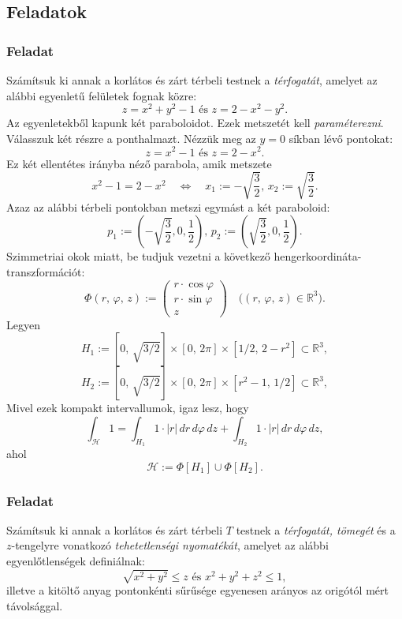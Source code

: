 \documentclass{article}
\newcommand{\R}{\mathbb{R}}
\begin{document}
	\subsection{Feladatok}
	\subsubsection{Feladat}
	Számítsuk ki annak a korlátos és zárt térbeli testnek a \textit{térfogatát}, amelyet az alábbi egyenletű felületek fognak közre:
	\[
		z = x^2 + y^2 -1 \text{ és } z = 2 - x^2 - y^2.
	\]
	Az egyenletekből kapunk két paraboloidot. Ezek metszetét kell \textit{paraméterezni}. Válasszuk két részre a ponthalmazt. Nézzük meg az $y = 0$ síkban lévő pontokat:
	\[
		z = x^2 - 1 \text{ és } z = 2 - x^2.
	\]
	Ez két ellentétes irányba néző parabola, amik metszete
	\[
		x^2 - 1 = 2 - x^2 \quad \Longleftrightarrow \quad x_1 := - \sqrt{\frac{3}{2}}, \, x_2 := \sqrt{\frac{3}{2}}.
	\]
	Azaz az alábbi térbeli pontokban metszi egymást a két paraboloid:
	\[
		p_1 := \left( - \sqrt{\frac{3}{2}}, 0, \frac{1}{2} \right), \, p_2 := \left( \sqrt{\frac{3}{2}}, 0, \frac{1}{2} \right).
	\]
	Szimmetriai okok miatt, be tudjuk vezetni a következő hengerkoordináta-transzformációt:
	\[
		\Phi(r, \, \varphi, \, z) := \begin{pmatrix}
			r \cdot \cos \varphi \\
			r \cdot \sin \varphi \\
			z
		\end{pmatrix} \quad \big( (r, \, \varphi, \, z) \in \R^3 \big).
	\]
	Legyen
	\[
		H_1 := [0, \, \sqrt{3 / 2}] \times [0, \, 2 \pi] \times [1/2, \, 2-r^2] \subset \R^3,
	\]
	\[
		H_2 := [0, \, \sqrt{3 / 2}] \times [0, \, 2 \pi] \times [r^2-1, \, 1/2] \subset \R^3,
	\]
	Mivel ezek kompakt intervallumok, igaz lesz, hogy
	\[
		\int_{\mathcal{H}} 1 = \int_{H_1} 1 \cdot |r| \, dr \, d\varphi \, dz + \int_{H_2} 1 \cdot |r| \, dr \, d\varphi \, dz, 
	\]
	ahol
	\[
		\mathcal{H} := \Phi[H_1] \cup \Phi[H_2].
	\]
	
	\subsubsection{Feladat}
	Számítsuk ki annak a korlátos és zárt térbeli $T$ testnek a \textit{térfogatát, tömegét} és a $z$-tengelyre vonatkozó \textit{tehetetlenségi nyomatékát}, amelyet az alábbi egyenlőtlenségek definiálnak:
	\[
		\sqrt{x^2 + y^2} \leq z \text{ és } x^2 + y^2 + z^2 \leq 1,
	\]
	illetve a kitöltő anyag pontonkénti sűrűsége egyenesen arányos az origótól mért távolsággal.
\end{document}
